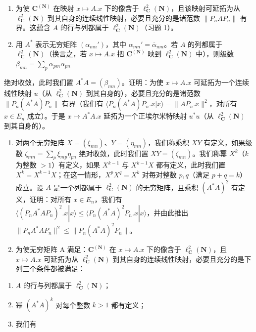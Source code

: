 \begin{enumerate}
\begin{enumerate}
\def\labelenumi{\alph{enumi})}
\item
  为使 \(\mathbf{C}^{(\mathbf{N})}\) 在映射 \(x\mapsto A.x\) 下的像含于 \(\ell_{\mathbf{C}}^2 (\mathbf{N})\)，且该映射可延拓为从 \(\ell_{\mathbf{C}}^2 (\mathbf{N})\) 到其自身的连续线性映射，必要且充分的是诸范数 \(\| P_nAP_n\|\) 有界。这蕴含 \(A\) 的行与列都属于 \(\ell_{\mathbf{C}}^2 (\mathbf{N})\)（习题 1）。
\item
  用 \(A^*\) 表示无穷矩阵 \((\alpha_{mn}')\)，其中 \(\alpha_{mn}' = \overline{\alpha}_{nm}\)。若 \(A\) 的列都属于 \(\ell_{\mathbf{C}}^2(\mathbf{N})\)（换言之，若 \(x \mapsto A.x\) 把 \(\mathbf{C}^{(\mathbf{N})}\) 映到 \(\ell_{\mathbf{C}}^2(\mathbf{N})\) 中），则级数 \(\beta_{mn} = \sum_{p} \overline{\alpha}_{pm} \alpha_{pn}\)
\end{enumerate}

绝对收敛，此时我们置 \(A^{*}A = (\beta_{mn})\)。证明：为使 \(x \mapsto A.x\) 可延拓为一个连续线性映射 \(u\)（从 \(\ell_{\mathbf{C}}^{2}(\mathbf{N})\) 到其自身的），必要且充分的是诸范数 \(\| P_n(A^*A)P_n\|\) 有界（我们有 \(\langle P_n(A^*A)P_n.x|x\rangle = \| AP_n .x\|^2\)，对所有 \(x\in E_n\) 成立）。于是 \(x\mapsto A^{*}A.x\) 延拓为一个正埃尔米特映射 \(u^{*}u\)（从 \(\ell_{\mathbf{C}}^{2}(\mathbf{N})\) 到其自身的）。

\begin{enumerate}
\def\labelenumi{\alph{enumi})}
\setcounter{enumi}{2}
\item
  对两个无穷矩阵 \(X = (\xi_{mn})\)、\(Y = (\eta_{mn})\)，我们称乘积 \(XY\) 有定义，如果级数 \(\zeta_{mn} = \sum_{p} \xi_{mp} \eta_{pn}\) 绝对收敛，此时我们置 \(XY = (\zeta_{mn})\)。我们称幂 \(X^k\)（\(k\) 为整数 \(> 1\)）有定义，如果 \(X^{k-1}\) 与 \(X^{k-1}X\) 都有定义，此时我们置 \(X^k = X^{k-1}X\)；在这一情形，\(X^pX^q = X^k\) 对每对整数 \(p, q\)（满足 \(p + q = k\)）成立。设 \(A\) 是一个列都属于 \(\ell_{\mathbf{C}}^2(\mathbf{N})\) 的无穷矩阵，且乘积 \((A^*A)^2\) 有定义，证明：对所有 \(x \in E_n\)，我们有 \(\langle (P_nA^*AP_n)^2.x|x\rangle \leqslant \langle P_n(A^*A)^2P_n.x|x\rangle\)，并由此推出 \(\| P_nA^*AP_n\|^2 \leqslant \| P_n(A^*A)^2P_n\|\)。
\item
  为使无穷矩阵 A 满足：\(\mathbf{C}^{(\mathbf{N})}\) 在 \(x\mapsto A.x\) 下的像含于 \(\ell_{\mathbf{C}}^2 (\mathbf{N})\)，且 \(x\mapsto A.x\) 可延拓为从 \(\ell_{\mathbf{C}}^2 (\mathbf{N})\) 到其自身的连续线性映射，必要且充分的是下列三个条件都被满足：
\end{enumerate}

\begin{enumerate}
\def\labelenumi{(\roman{enumi})}
\item
  \(A\) 的行与列都属于 \(\ell_{\mathbf{C}}^{2}(\mathbf{N})\)；
\item
  幂 \((A^{*}A)^{k}\) 对每个整数 \(k > 1\) 都有定义；
\item
  我们有
\end{enumerate}


\end{enumerate}
